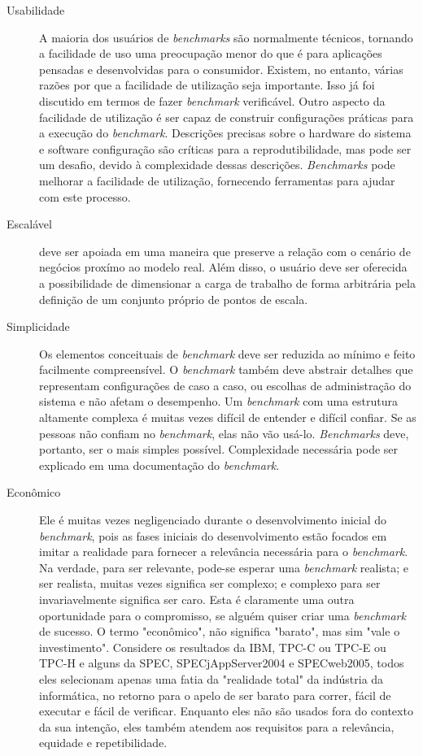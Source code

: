 \begin{description}
	\item[Usabilidade] A maioria dos usuários de \textit{benchmarks} são normalmente técnicos, tornando a facilidade de uso uma preocupação menor do que é para aplicações pensadas e desenvolvidas para o consumidor. Existem, no entanto, várias razões por que a facilidade de utilização seja importante.
	Isso já foi discutido em termos de fazer \textit{benchmark} verificável. Outro aspecto da facilidade de utilização é ser capaz de construir configurações práticas para a execução do \textit{benchmark}. Descrições precisas sobre o hardware do sistema e software configuração são críticas para a reprodutibilidade, mas pode ser um desafio, devido à complexidade dessas descrições.
	\textit{Benchmarks} pode melhorar a facilidade de utilização, fornecendo ferramentas para ajudar com este processo. \cite{Kistowski2015}
	
	\item[Escalável] deve ser apoiada em uma maneira que preserve a relação com o cenário de negócios proxímo ao modelo real. Além disso, o usuário deve ser oferecida a possibilidade de dimensionar a carga de trabalho de forma arbitrária pela definição de um conjunto próprio de pontos de escala. \cite{Marco2012}
	
	\item[Simplicidade] Os elementos conceituais de \textit{benchmark} deve ser reduzida ao mínimo e feito facilmente compreensível. O \textit{benchmark} também deve abstrair detalhes que representam configurações de caso a caso, ou escolhas de administração do sistema e não afetam o desempenho. \cite{Chen2014} Um \textit{benchmark} com uma estrutura altamente complexa é muitas vezes difícil de entender e difícil confiar. Se as pessoas não confiam no \textit{benchmark}, elas não vão usá-lo. \textit{Benchmarks} deve, portanto, ser o mais simples possível. Complexidade necessária pode ser explicado em uma documentação do \textit{benchmark}.\cite{Weber2014}
	
	\item[Econômico] Ele é muitas vezes negligenciado durante o desenvolvimento inicial do \textit{benchmark}, pois as fases iniciais do desenvolvimento estão focados em imitar a realidade para fornecer a relevância necessária para o \textit{benchmark}. Na verdade, para ser relevante, pode-se esperar uma \textit{benchmark} realista; e ser realista, muitas vezes significa ser complexo; e complexo para ser invariavelmente significa ser caro. Esta é claramente uma outra oportunidade para o compromisso, se alguém quiser criar uma \textit{benchmark} de sucesso. O termo "econômico", não significa "barato", mas sim "vale o investimento".
	Considere os resultados da IBM, TPC-C ou TPC-E ou TPC-H e alguns da SPEC, SPECjAppServer2004 e  SPECweb2005, todos eles selecionam apenas uma fatia da "realidade total" da indústria da informática, no retorno para o apelo de ser barato para correr, fácil de executar e fácil de verificar. Enquanto eles não são usados fora do contexto da sua intenção, eles também atendem aos requisitos para a relevância, equidade e repetibilidade. \cite{Huppler2009}
	

\end{description}
